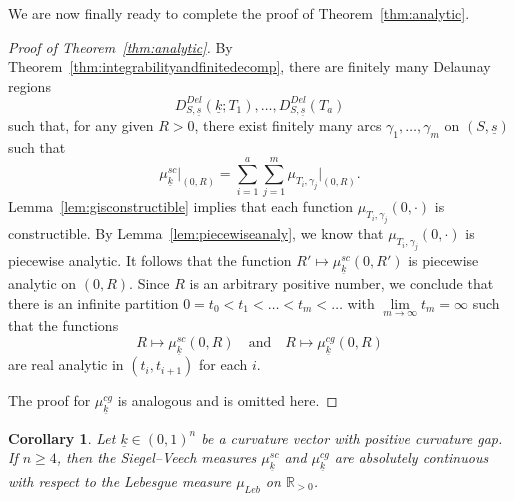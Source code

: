\documentclass{compositio}
\numberwithin{equation}{section}
\numberwithin{figure}{section}
\theoremstyle{definition}
\theoremstyle{plain}
\newtheorem{corollary}[definition]{Corollary}
\begin{document}
{We are now finally ready to complete the proof of Theorem~\ref{thm:analytic}.

\begin{proof}[Proof of Theorem~\ref{thm:analytic}]
    By Theorem~\ref{thm:integrabilityandfinitedecomp}, there are finitely many Delaunay regions 
    $$
    D_{S,\underline{s}}^{Del}(\underline{k};T_1), \ldots, D_{S,\underline{s}}^{Del}(T_a)
    $$ 
    such that, for any given $R > 0$, there exist finitely many arcs $\gamma_1, \ldots, \gamma_m$ on $(S, \underline{s})$ such that
    $$
        \mu^{sc}_{\underline{k}}\Big|_{(0, R)} = \sum_{i=1}^{a} \sum_{j=1}^{m} \mu_{T_i, \gamma_j}\Big|_{(0, R)}.
    $$
    Lemma~\ref{lem:gisconstructible} implies that each function $\mu_{T_i, \gamma_j}(0,\cdot)$ is constructible. By Lemma~\ref{lem:piecewiseanaly}, we know that $\mu_{T_i, \gamma_j}(0,\cdot)$ is piecewise analytic. It follows that the function $R'\mapsto \mu^{sc}_{\underline{k}}(0, R')$ is piecewise analytic on $(0,R)$. Since $R$ is an arbitrary positive number, we conclude that there is an infinite partition $0 = t_0 < t_1 < \ldots < t_m < \ldots$ with $\lim\limits_{m \to \infty} t_m = \infty$ such that the functions
    $$
    R \mapsto \mu^{sc}_{\underline{k}}(0, R) \quad \text{and} \quad R \mapsto \mu^{cg}_{\underline{k}}(0, R)
    $$
    are real analytic in $(t_i, t_{i+1})$ for each $i$.

    The proof for $\mu^{cg}_{\underline{k}}$ is analogous and is omitted here.
\end{proof}

\begin{corollary}\label{cor:abc}
    Let $\underline{k}\in(0,1)^n$ be a curvature vector with positive curvature gap. If $n\ge 4$, then the Siegel--Veech measures $\mu^{sc}_{\underline{k}}$ and $\mu^{cg}_{\underline{k}}$ are absolutely continuous with respect to the Lebesgue measure $\mu_{Leb}$ on $\mathbb{R}_{>0}$. 
\end{corollary}

}
\end{document}
